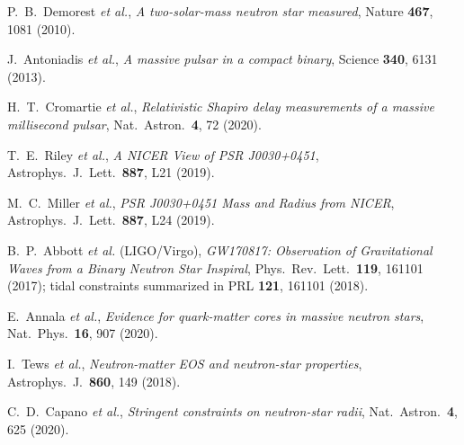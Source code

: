 \documentclass[11pt]{article}
\begin{document}
\begin{thebibliography}{99}
P.~B.~Demorest \emph{et al.}, \emph{A two-solar-mass neutron star measured}, Nature \textbf{467}, 1081 (2010).

J.~Antoniadis \emph{et al.}, \emph{A massive pulsar in a compact binary}, Science \textbf{340}, 6131 (2013).

H.~T.~Cromartie \emph{et al.}, \emph{Relativistic Shapiro delay measurements of a massive millisecond pulsar}, Nat.\ Astron.\ \textbf{4}, 72 (2020).

T.~E.~Riley \emph{et al.}, \emph{A NICER View of PSR J0030+0451}, Astrophys.\ J.\ Lett.\ \textbf{887}, L21 (2019).

M.~C.~Miller \emph{et al.}, \emph{PSR J0030+0451 Mass and Radius from NICER}, Astrophys.\ J.\ Lett.\ \textbf{887}, L24 (2019).

B.~P.~Abbott \emph{et al.} (LIGO/Virgo), \emph{GW170817: Observation of Gravitational Waves from a Binary Neutron Star Inspiral}, Phys.\ Rev.\ Lett.\ \textbf{119}, 161101 (2017); tidal constraints summarized in PRL \textbf{121}, 161101 (2018).

E.~Annala \emph{et al.}, \emph{Evidence for quark-matter cores in massive neutron stars}, Nat.\ Phys.\ \textbf{16}, 907 (2020).

I.~Tews \emph{et al.}, \emph{Neutron-matter EOS and neutron-star properties}, Astrophys.\ J.\ \textbf{860}, 149 (2018).

C.~D.~Capano \emph{et al.}, \emph{Stringent constraints on neutron-star radii}, Nat.\ Astron.\ \textbf{4}, 625 (2020).

\end{thebibliography}
\end{document}
